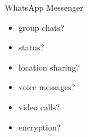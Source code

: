 \begin{frame}{\insertsubsection}
\begin{fancycolumns}
\begin{example}{WhatsApp Messenger}
			\begin{fancycolumns}[animation=none]
				\begin{itemize}
					\item group chats?
					\item status?
					\item location sharing?
				\end{itemize}
			\nextcolumn
				\begin{itemize}
					\item voice messages?
					\item video calls?
					\item encryption?
				\end{itemize}
			\end{fancycolumns}
		\end{example}
	\end{fancycolumns}
\end{frame}

